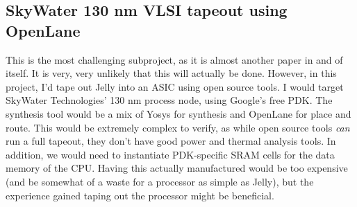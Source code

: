 \documentclass{article}
\begin{document}
\subsection{SkyWater 130 nm VLSI tapeout using OpenLane}
This is the most challenging subproject, as it is almost another paper in and of itself. It is very, very 
unlikely that this will actually be done. However, in this project, I'd tape out Jelly into an ASIC using 
open source tools. I would target SkyWater Technologies' 130 nm process node, using Google's free PDK. The 
synthesis tool would be a mix of Yosys for synthesis and OpenLane for place and route. This would be extremely 
complex to verify, as while open source tools \textit{can} run a full tapeout, they don't have good power and 
thermal analysis tools. In addition, we would need to instantiate PDK-specific SRAM cells for the data memory
of the CPU. Having this actually manufactured would be too expensive (and be somewhat of a waste for a processor
as simple as Jelly), but the experience gained taping out the processor might be beneficial.
\end{document}
